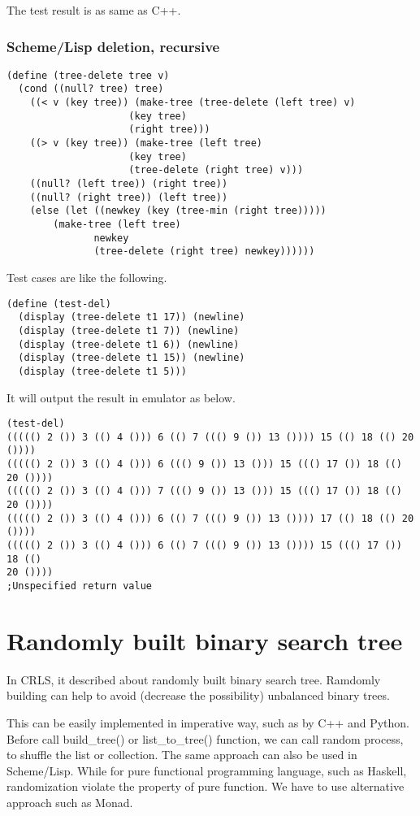 \documentclass{article}
\begin{document}
The test result is as same as C++.

\subsubsection*{Scheme/Lisp deletion, recursive}

\lstset{language=lisp}
\begin{lstlisting}
(define (tree-delete tree v)
  (cond ((null? tree) tree)
	((< v (key tree)) (make-tree (tree-delete (left tree) v)
				     (key tree)
				     (right tree)))
	((> v (key tree)) (make-tree (left tree)
				     (key tree)
				     (tree-delete (right tree) v)))
	((null? (left tree)) (right tree))
	((null? (right tree)) (left tree))
	(else (let ((newkey (key (tree-min (right tree)))))
		(make-tree (left tree)
			   newkey
			   (tree-delete (right tree) newkey))))))
\end{lstlisting}

Test cases are like the following.

\begin{lstlisting}
(define (test-del)
  (display (tree-delete t1 17)) (newline)
  (display (tree-delete t1 7)) (newline)
  (display (tree-delete t1 6)) (newline)
  (display (tree-delete t1 15)) (newline)
  (display (tree-delete t1 5)))
\end{lstlisting}

It will output the result in emulator as below.

\begin{verbatim}
(test-del)
((((() 2 ()) 3 (() 4 ())) 6 (() 7 ((() 9 ()) 13 ()))) 15 (() 18 (() 20 ())))
((((() 2 ()) 3 (() 4 ())) 6 ((() 9 ()) 13 ())) 15 ((() 17 ()) 18 (() 20 ())))
((((() 2 ()) 3 (() 4 ())) 7 ((() 9 ()) 13 ())) 15 ((() 17 ()) 18 (() 20 ())))
((((() 2 ()) 3 (() 4 ())) 6 (() 7 ((() 9 ()) 13 ()))) 17 (() 18 (() 20 ())))
((((() 2 ()) 3 (() 4 ())) 6 (() 7 ((() 9 ()) 13 ()))) 15 ((() 17 ()) 18 (() 
20 ())))
;Unspecified return value
\end{verbatim}

\section{Randomly built binary search tree}
In CRLS\cite{CLRS}, it described about randomly built binary search tree.
Ramdomly building can help to avoid (decrease the possibility) unbalanced
binary trees.

This can be easily implemented in imperative way, such as by C++ and Python.
Before call build\_tree() or list\_to\_tree() function, we can call random
process, to shuffle the list or collection. The same approach can also be
used in Scheme/Lisp. While for pure functional programming language, such as
Haskell, randomization violate the property of pure function. We have to
use alternative approach such as Monad.
\end{document}
